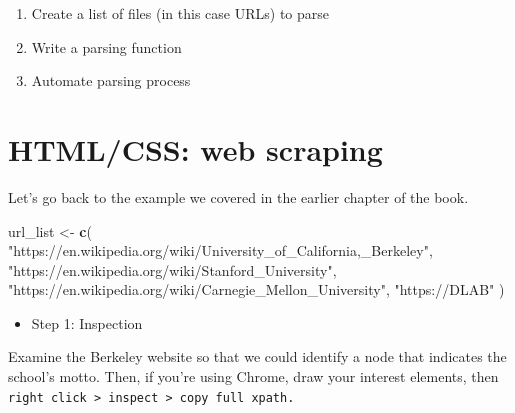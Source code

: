 \documentclass[
]{book}
\newenvironment{Shaded}{\begin{snugshade}}{\end{snugshade}}
\newcommand{\FunctionTok}[1]{\textcolor[rgb]{0.13,0.29,0.53}{\textbf{#1}}}
\newcommand{\NormalTok}[1]{#1}
\newcommand{\OtherTok}[1]{\textcolor[rgb]{0.56,0.35,0.01}{#1}}
\newcommand{\StringTok}[1]{\textcolor[rgb]{0.31,0.60,0.02}{#1}}
\providecommand{\tightlist}{%
  \setlength{\itemsep}{0pt}\setlength{\parskip}{0pt}}
\begin{document}
\begin{enumerate}
\def\labelenumi{\arabic{enumi}.}
\setcounter{enumi}{2}
\item
  Create a list of files (in this case URLs) to parse
\item
  Write a parsing function
\item
  Automate parsing process
\end{enumerate}

\section{HTML/CSS: web scraping}\label{htmlcss-web-scraping}

Let's go back to the example we covered in the earlier chapter of the book.

\begin{Shaded}
\begin{Highlighting}[]
\NormalTok{url\_list }\OtherTok{\textless{}{-}} \FunctionTok{c}\NormalTok{(}
  \StringTok{"https://en.wikipedia.org/wiki/University\_of\_California,\_Berkeley"}\NormalTok{,}
  \StringTok{"https://en.wikipedia.org/wiki/Stanford\_University"}\NormalTok{,}
  \StringTok{"https://en.wikipedia.org/wiki/Carnegie\_Mellon\_University"}\NormalTok{,}
  \StringTok{"https://DLAB"}
\NormalTok{)}
\end{Highlighting}
\end{Shaded}

\begin{itemize}
\tightlist
\item
  Step 1: Inspection
\end{itemize}

Examine the Berkeley website so that we could identify a node that indicates the school's motto. Then, if you're using Chrome, draw your interest elements, then \texttt{right\ click\ \textgreater{}\ inspect\ \textgreater{}\ copy\ full\ xpath.}
\end{document}
